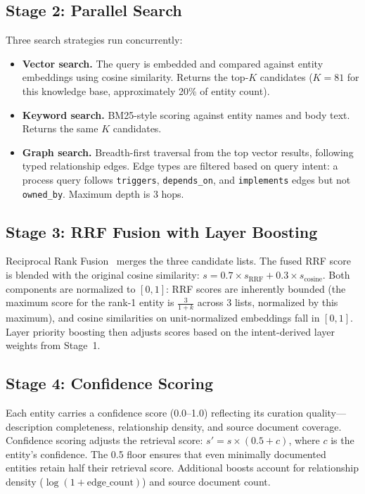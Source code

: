 \documentclass[11pt,a4paper]{article}
\begin{document}
\subsection{Stage 2: Parallel Search}

Three search strategies run concurrently:

\begin{itemize}[nosep]
  \item \textbf{Vector search.} The query is embedded and compared against entity embeddings using cosine similarity. Returns the top-$K$ candidates ($K = 81$ for this knowledge base, approximately 20\% of entity count).
  \item \textbf{Keyword search.} BM25-style scoring against entity names and body text. Returns the same $K$ candidates.
  \item \textbf{Graph search.} Breadth-first traversal from the top vector results, following typed relationship edges. Edge types are filtered based on query intent: a process query follows \texttt{triggers}, \texttt{depends\_on}, and \texttt{implements} edges but not \texttt{owned\_by}. Maximum depth is 3 hops.
\end{itemize}

\subsection{Stage 3: RRF Fusion with Layer Boosting}

Reciprocal Rank Fusion~\citep{cormack2009rrf} merges the three candidate lists. The fused RRF score is blended with the original cosine similarity: $s = 0.7 \times s_{\text{RRF}} + 0.3 \times s_{\text{cosine}}$. Both components are normalized to $[0, 1]$: RRF scores are inherently bounded (the maximum score for the rank-1 entity is $\frac{3}{1+k}$ across 3 lists, normalized by this maximum), and cosine similarities on unit-normalized embeddings fall in $[0, 1]$. Layer priority boosting then adjusts scores based on the intent-derived layer weights from Stage~1.

\subsection{Stage 4: Confidence Scoring}

Each entity carries a confidence score (0.0--1.0) reflecting its curation quality---description completeness, relationship density, and source document coverage. Confidence scoring adjusts the retrieval score: $s' = s \times (0.5 + c)$, where $c$ is the entity's confidence. The 0.5 floor ensures that even minimally documented entities retain half their retrieval score. Additional boosts account for relationship density ($\log(1 + \text{edge\_count})$) and source document count.
\end{document}
